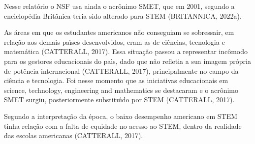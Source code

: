 \documentclass[
12pt,		%
openright,	%
twoside,  %
a4paper,			%
chapter=TITLE,		%
english,			%
french,				%
spanish,			%
brazil				%
]{USPSC-classe/USPSC}
\begin{document}
\noindent\begin{center}\mbox{\centering{}}\end{center}


Nesse relat\'orio o NSF usa ainda o acr\^onimo SMET, que em 2001, segundo a enciclop\'edia Brit\^anica teria sido alterado para STEM  (BRITANNICA, 2022a).

















As \'areas em que os estudantes americanos n\~ao conseguiam se sobressair, em rela\c{c}\~ao aos demais pa\'{\i}ses desenvolvidos, eram as de ci\^encias, tecnologia e matem\'atica  (CATTERALL, 2017). Essa situa\c{c}\~ao passou a representar inc\^omodo para os gestores educacionais do pa\'{\i}s, dado que n\~ao refletia a sua imagem pr\'opria de pot\^encia internacional  (CATTERALL, 2017), principalmente no campo da ci\^encia e tecnologia. Foi nesse momento que as iniciativas educacionais em \textquotedbl science, technology, engineering and mathematics se destacaram e o acr\^onimo SMET surgiu, posteriormente substitu\'{\i}do por STEM  (CATTERALL, 2017).

















Segundo a interpreta\c{c}\~ao da \'epoca, o baixo desempenho americano em STEM tinha rela\c{c}\~ao com a falta de equidade no acesso ao STEM, dentro da realidade das escolas americanas  (CATTERALL, 2017).
\end{document}
